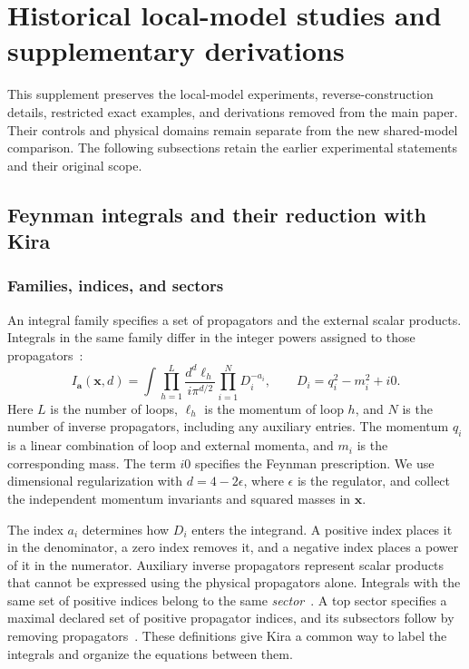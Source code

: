 \section{Historical local-model studies and supplementary derivations}
\label{sec:paper-history}
This supplement preserves the local-model experiments, reverse-construction details, restricted exact examples, and derivations removed from the main paper. Their controls and physical domains remain separate from the new shared-model comparison. The following subsections retain the earlier experimental statements and their original scope.
\subsection{Feynman integrals and their reduction with Kira}
\label{history:sec:reduction}
\subsubsection{Families, indices, and sectors}
An integral family specifies a set of propagators and the external scalar products. Integrals in the same family differ in the integer powers assigned to those propagators~\cite{Weinzierl2022,KiraOriginal}:
\begin{equation}
 I_{\boldsymbol a}(\boldsymbol x,d)
 =\int\prod_{h=1}^{L}\frac{d^d\ell_h}{i\pi^{d/2}}
       \prod_{i=1}^{N}D_i^{-a_i},
 \qquad D_i=q_i^2-m_i^2+i0.
 \label{history:eq:family}
\end{equation}
Here $L$ is the number of loops, $\ell_h$ is the momentum of loop $h$, and $N$ is the number of inverse propagators, including any auxiliary entries. The momentum $q_i$ is a linear combination of loop and external momenta, and $m_i$ is the corresponding mass. The term $i0$ specifies the Feynman prescription. We use dimensional regularization with $d=4-2\epsilon$, where $\epsilon$ is the regulator, and collect the independent momentum invariants and squared masses in $\boldsymbol x$.

The index $a_i$ determines how $D_i$ enters the integrand. A positive index places it in the denominator, a zero index removes it, and a negative index places a power of it in the numerator. Auxiliary inverse propagators represent scalar products that cannot be expressed using the physical propagators alone. Integrals with the same set of positive indices belong to the same \emph{sector}~\cite{KiraOriginal}. A top sector specifies a maximal declared set of positive propagator indices, and its subsectors follow by removing propagators~\cite{KiraOriginal}. These definitions give Kira a common way to label the integrals and organize the equations between them.


